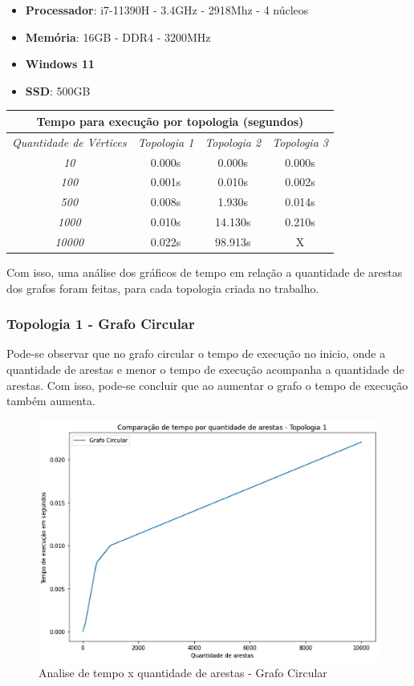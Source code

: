 \begin{itemize}
  \item \textbf{Processador}: i7-11390H - 3.4GHz - 2918Mhz - 4 núcleos 
  \item \textbf{Memória}: 16GB - DDR4 - 3200MHz
  \item \textbf{Windows 11}
  \item \textbf{SSD}: 500GB
\end{itemize}

\begin{center}
    \begin{tabular}{|c | c | c | c|} 
     \hline
        \multicolumn{4}{|c|}{\textbf{Tempo para execução por topologia (segundos)}} \\
     \hline
         \emph{Quantidade de Vértices} & \emph{Topologia 1} & \emph{Topologia 2} & \emph{Topologia 3}  \\ [0.5ex] 
     \hline
         \emph{10} & 0.000s & 0.000s  & 0.000s \\ 
     \hline
         \emph{100} & 0.001s & 0.010s & 0.002s \\
     \hline
         \emph{500} & 0.008s & 1.930s & 0.014s \\
     \hline
         \emph{1000} & 0.010s & 14.130s & 0.210s \\
     \hline
         \emph{10000} & 0.022s & 98.913s  & X \\
     \hline
    \end{tabular}
\end{center}

Com isso, uma análise dos gráficos de tempo em relação a quantidade de arestas dos grafos foram feitas, para cada topologia criada no trabalho.

\subsubsection{Topologia 1 - Grafo Circular}

Pode-se observar que no grafo circular o tempo de execução no inicio, onde a quantidade de arestas e menor o tempo de execução acompanha a quantidade de arestas. Com isso, pode-se concluir que ao aumentar o grafo o tempo de execução também aumenta.

\begin{figure}[ht]
    \centering
    \includegraphics[width=.6\textwidth]{figuras/circular.png}
    \caption{Analise de tempo x quantidade de arestas - Grafo Circular}
    \label{fig:figure20}
\end{figure}

